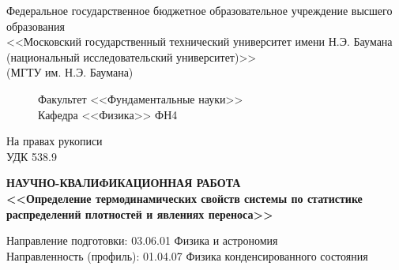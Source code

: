 \documentclass[%
candidate, %
subf, %
times %
]{disser}
\begin{document}
%


\begin{titlepage}

\begin{center}
{
\footnotesize{}
Федеральное государственное бюджетное образовательное учреждение высшего образования\\
<<Московский государственный технический университет имени Н.Э. Баумана\\ (национальный исследовательский университет)>>\\(МГТУ им. Н.Э. Баумана)\\
}
\end{center}
\begin{figure}[h!]
\begin{minipage}[b]{0.9\textwidth}\centering
Факультет <<Фундаментальные науки>>\\
Кафедра <<Физика>> ФН4\\\vspace{1.7cm}
\end{minipage}
\end{figure}
\begin{flushright}
На правах рукописи\\
УДК 538.9
\end{flushright}

\vspace{10mm}

\begin{center}
\textbf{НАУЧНО-КВАЛИФИКАЦИОННАЯ РАБОТА}\\\vspace{5mm}
\textbf{<<Определение термодинамических свойств системы по статистике распределений плотностей и явлениях переноса>>}
\end{center}


\vspace{5mm}

\begin{flushleft}
Направление подготовки: 03.06.01 Физика и астрономия\\
Направленность (профиль): 01.04.07 Физика конденсированного состояния
\end{flushleft}


\end{titlepage}
\end{document}
